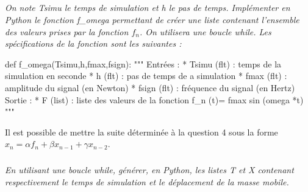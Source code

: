 \documentclass[10pt]{article}
\newif\ifprof
\begin{document}
\subparagraph{}
\textit{On note \textsf{Tsimu} le temps de simulation et \textsf{h} le pas de temps. Implémenter en Python le fonction \textsf{f\_omega} 
permettant de créer une liste contenant l'ensemble des valeurs prises par la fonction $f_n$. On utilisera une boucle \textsf{while}. Les spécifications de la fonction sont les suivantes : }

\begin{py}
\begin{python}
def f_omega(Tsimu,h,fmax,fsign):
   """
   Entrées :
       * Tsimu (flt) : temps de la simulation en seconde
       * h (flt) : pas de temps de a simulation
       * fmax (flt) : amplitude du signal (en Newton)
       * fsign (flt) : fréquence du signal (en Hertz)
   Sortie : 
       * F (list) : liste des valeurs de la fonction 
          f_n (t)= fmax sin (omega *t)
   """
\end{python}
\end{py}

\ifprof
\begin{corrige}
\begin{py}
\begin{python}
def f_omega(Tsimu,h,fmax,fsign):
   """
   Entrées :
       * Tsimu (flt) : temps de la simulation en seconde
       * h (flt) : pas de temps de a simulation
       * fmax (flt) : amplitude du signal (en Newton)
       * fsign (flt) : fréquence du signal (en Hertz)
   Sortie : 
       * F (list) : liste des valeurs de la fonction 
          f_n (t)= fmax sin (omega *t)
   """
    omega  = 2*math.pi*fsign
    t=0 
    F = []
    while t<Tsimu :
        F.append(fmax*math.sin(omega*t))
        t=t+h
    return F
    
\end{python}
\end{py}

\end{corrige}
\else
\fi


Il est possible de mettre la suite déterminée à la question 4 sous la forme $x_n = \alpha f_n +\beta x_{n-1} + \gamma x_{n-2}$.

\subparagraph{}
\textit{En utilisant une boucle \textsf{while}, générer, en Python, les listes \textsf{T} et \textsf{X} contenant respectivement le temps de simulation et le déplacement de la masse mobile.}
\ifprof
\begin{corrige}
\begin{python}

T=[0,h]
X=[0,0]
t=2*h
i=2
while t<Tsimu:
    T.append(t)
    X.append(alpha*F[i]+beta*X[i-1] +gamma*X(i-2))
    i=i+1
    t = t+h
\end{python}
\end{corrige}
\else
\fi
\end{document}
